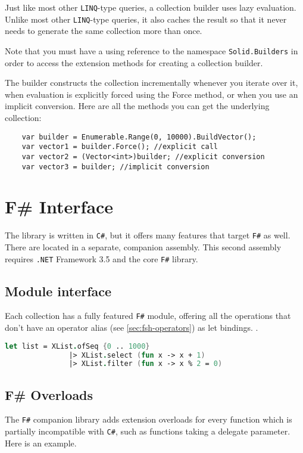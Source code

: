 \documentclass[]{article}
\newcommand{\codeformat}{\ttfamily}
\newcommand{\keywordformat}{\codeformat\color{blue}}
\newcommand{\keyword}[1]{{\keywordformat #1}}
\newcommand{\code}[1]{\texttt{#1}}
\newcommand{\dotnet}{\texttt{.NET}\xspace}
\newcommand{\linq}{\texttt{LINQ}\xspace}
\newcommand{\fsh}{\texttt{F\#}\xspace}
\newcommand{\csh}{\texttt{C\#}\xspace}
\begin{document}
Just like most other \linq-type queries, a collection builder uses lazy evaluation. Unlike most other \linq-type queries, it also caches the result so that it never needs to generate the same collection more than once.

Note that you must have a \keyword{using} reference to the namespace \code{Solid.Builders} in order to access the extension methods for creating a collection builder.

The builder constructs the collection incrementally whenever you iterate over it, when evaluation is explicitly forced using the Force method, or when you use an implicit conversion. Here are all the methods you can get the underlying collection:

\begin{lstlisting}
	var builder = Enumerable.Range(0, 10000).BuildVector();
	var vector1 = builder.Force(); //explicit call
	var vector2 = (Vector<int>)builder; //explicit conversion
	var vector3 = builder; //implicit conversion
\end{lstlisting}

\section{F\# Interface}\label{sec:fsharp}
The library is written in \csh, but it offers many features that target \fsh as well. There are located in a separate, companion assembly. This second assembly requires \dotnet Framework 3.5 and the core \fsh library.

\subsection{Module interface}\label{sec:fsh-module}
Each collection has a fully featured \fsh module, offering all the operations that don't have an operator alias (see \cref{sec:fsh-operators}) as \keyword{let} bindings. . 

\begin{lstlisting}[language=fsharp]
	let list = XList.ofSeq {0 .. 1000} 
			   |> XList.select (fun x -> x + 1)
			   |> XList.filter (fun x -> x % 2 = 0)
\end{lstlisting}

\subsection{F\# Overloads}\label{sec:fsh-overloads}
The \fsh companion library adds extension overloads for every function which is partially incompatible with \csh, such as functions taking a delegate parameter. Here is an example.
\end{document}
